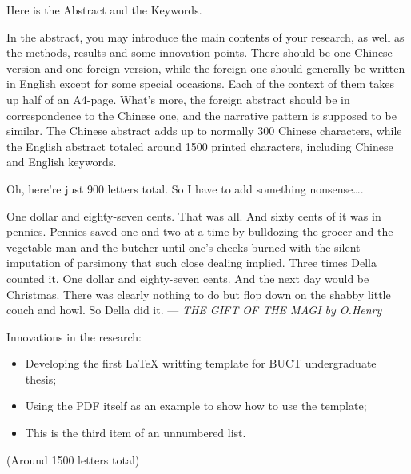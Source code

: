 \begin{abstracten}
	Here is the Abstract and the Keywords.

	In the abstract, you may introduce the main contents of your research,
	as well as the methods, results and some innovation points. There should
	be one Chinese version and one foreign version, while the foreign one
	should generally be written in English except for some special occasions.
	Each of the context of them takes up half of an A4-page. What's more,
	the foreign abstract should be in correspondence to the Chinese one,
	and the narrative pattern is supposed to be similar. The Chinese abstract
	adds up to normally 300 Chinese characters, while the English abstract
	totaled around 1500 printed characters, including Chinese and English keywords.

	Oh, here're just 900 letters total. So I have to add something nonsense\dots.

	One dollar and eighty-seven cents. That was all. And sixty cents of it was
	in pennies. Pennies saved one and two at a time by bulldozing the grocer
	and the vegetable man and the butcher until one's cheeks burned with the
	silent imputation of parsimony that such close dealing implied. Three times
	Della counted it. One dollar and eighty-seven cents. And the next day would
	be Christmas. There was clearly nothing to do but flop down on the shabby
	little couch and howl. So Della did it.
	\hfill --- \textit{THE GIFT OF THE MAGI by O.Henry}

	Innovations in the research:
	\begin{itemize}
		\item Developing the first \LaTeX{} writting template for BUCT undergraduate thesis;
		\item Using the PDF itself as an example to show how to use the template;
		\item This is the third item of an unnumbered list.
	\end{itemize}

	(Around 1500 letters total)
\end{abstracten}